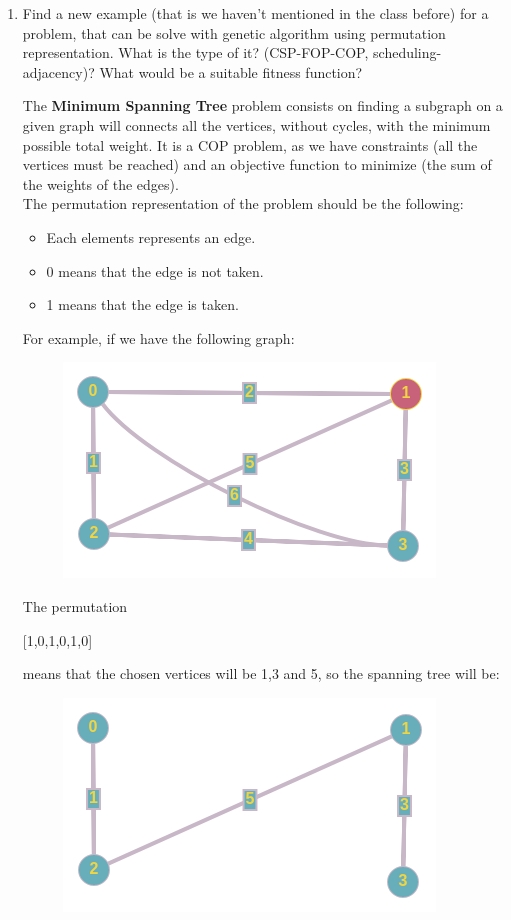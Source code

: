 \documentclass[12pt,english]{article}
\newenvironment{statement}{\fontfamily{ptm}\selectfont}{\par}
\begin{document}
\begin{enumerate}
	\item
		\begin{statement}
		Find a new example (that is we haven’t mentioned in the class before) for a problem, that can be solve with genetic algorithm using permutation representation. What is the type of it? (CSP-FOP-COP, scheduling-adjacency)? What would be a suitable fitness function?
		\end{statement}
		The \textbf{Minimum Spanning Tree} problem consists on finding a subgraph on a given graph will connects all the vertices, without cycles, with the minimum possible total weight. It is a COP problem, as we have constraints (all the vertices must be reached) and an objective function to minimize (the sum of the weights of the edges).\\
		The permutation representation of the problem should be the following:
		\begin{itemize}
			\item Each elements represents an edge.
			\item 0 means that the edge is not taken.
			\item 1 means that the edge is taken.
		\end{itemize}
		For example, if we have the following graph:
		\begin{figure}[H]
			\centering
			\includegraphics{img/graph}
		\end{figure}
		The permutation
		\begin{center}
			[1,0,1,0,1,0]
		\end{center}
		means that the chosen vertices will be 1,3 and 5, so the spanning tree will be:
		\begin{figure}[H]
			\centering
			\includegraphics{img/minspan}
		\end{figure}


\end{enumerate}
\end{document}
